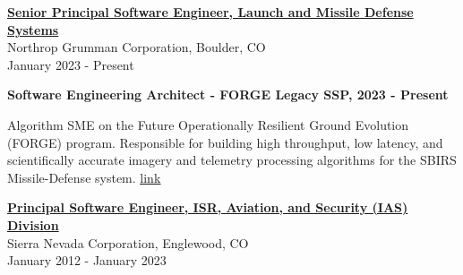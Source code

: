 \documentclass[10pt]{article}
\newenvironment{outerlist}[1][\enskip\textbullet]%
        {\begin{itemize}[#1]}{\end{itemize}%
         \vspace{-.6\baselineskip}}
\newenvironment{innerlist}[1][\enskip\textbullet]%
        {\begin{compactitem}[#1]}{\end{compactitem}}
\begin{document}
\href{http://northropgrumman.com}{
    \textbf{Senior Principal Software Engineer, Launch and Missile Defense Systems}}\\
    Northrop Grumman Corporation, Boulder, CO\\
    January 2023 - Present
    \begin{outerlist}
        \item \textbf{Software Engineering Architect - FORGE Legacy SSP, 2023 - Present}\\
        \begin{innerlist}
            \item Algorithm SME on the Future Operationally Resilient Ground Evolution (FORGE) program.  
                  Responsible for building high throughput, low latency, and scientifically accurate imagery and telemetry processing algorithms
                  for the SBIRS Missile-Defense system. \href{https://scitec.com/scitec-inc-awarded-45-8-million-contract-for-continued-development-of-forge-legacy-sbirs-ssp/}{\underline{link}}\\
        \end{innerlist}
    \end{outerlist}
\href{http://www.sncorp.com}{
     \textbf{Principal Software Engineer, ISR, Aviation, and Security (IAS) Division}}\\
     Sierra Nevada Corporation, Englewood, CO\\
     January 2012 - January 2023
\end{document}

